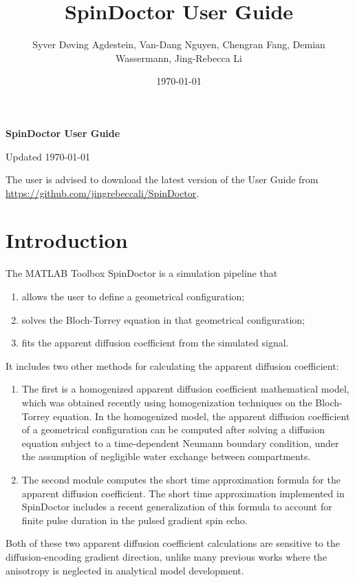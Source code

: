 \documentclass[a4paper]{article}
\title{SpinDoctor User Guide}
\author{Syver Døving Agdestein, Van-Dang Nguyen, Chengran Fang, Demian Wassermann, Jing-Rebecca Li}
\affil{\textbf{INRIA-Saclay, CMAP, 91120 Palaiseau, France}}
\date{\today}
\begin{document}
\textbf{\huge SpinDoctor User Guide}

Updated \today

The user is advised to download the latest version of the User Guide from \url{https://github.com/jingrebeccali/SpinDoctor}.




\setcounter{tocdepth}{2}
\tableofcontents
\newpage






\section{Introduction}
\label{sec:introduction}

The MATLAB Toolbox SpinDoctor \cite{lid} is a simulation pipeline that
\begin{enumerate}
    \item allows the user to define a geometrical configuration;
    \item solves the Bloch-Torrey equation in that geometrical configuration;
    \item fits the apparent diffusion coefficient from the simulated signal.
\end{enumerate}
It includes two other methods for calculating the apparent diffusion coefficient:
\begin{enumerate}
    \item The first is a homogenized apparent diffusion coefficient mathematical model, which was obtained recently using homogenization techniques on the Bloch-Torrey equation. In the homogenized model, the apparent diffusion coefficient of a geometrical configuration can be computed after solving a diffusion equation subject to a time-dependent Neumann boundary condition, under the assumption of negligible water exchange between compartments.
    \item The second module computes the short time approximation formula for the apparent diffusion coefficient. The short time approximation implemented in SpinDoctor includes a recent generalization of this formula to account for finite pulse duration in the pulsed gradient spin echo.
\end{enumerate}
Both of these two apparent diffusion coefficient calculations are sensitive to the diffusion-encoding gradient direction, unlike many previous works where the anisotropy is neglected in analytical model development.
\end{document}
